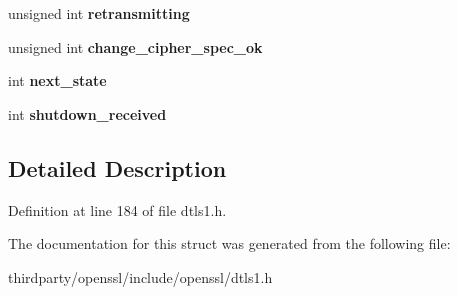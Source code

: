 \begin{DoxyCompactItemize}
unsigned int {\bfseries retransmitting}
\item 
\mbox{\label{structdtls1__state__st_a1d0bfd86d37d9058a404a119b2f68ee9}} 
unsigned int {\bfseries change\+\_\+cipher\+\_\+spec\+\_\+ok}
\item 
\mbox{\label{structdtls1__state__st_ab36e1f11a227d22300d6de44ea3ca7c7}} 
int {\bfseries next\+\_\+state}
\item 
\mbox{\label{structdtls1__state__st_adb9566c47686031f7236b44b25ff6356}} 
int {\bfseries shutdown\+\_\+received}
\end{DoxyCompactItemize}


\subsection{Detailed Description}


Definition at line 184 of file dtls1.\+h.



The documentation for this struct was generated from the following file\+:\begin{DoxyCompactItemize}
\item 
thirdparty/openssl/include/openssl/dtls1.\+h\end{DoxyCompactItemize}
